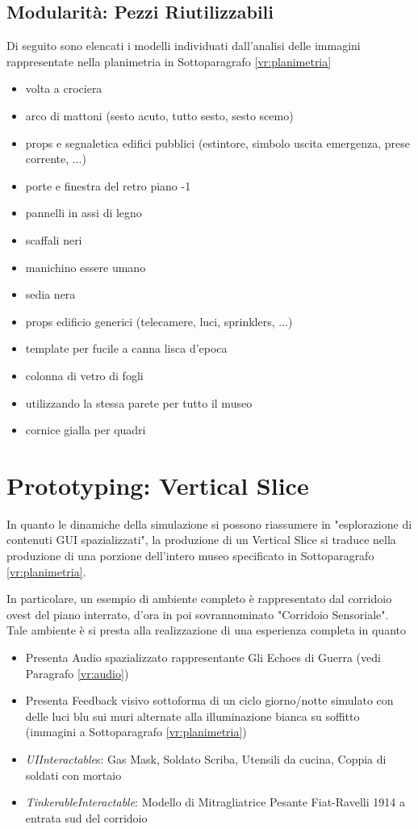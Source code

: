 \documentclass[10pt, openany]{article}
\begin{document}
  \subsection{Modularit\`a: Pezzi Riutilizzabili}\label{vr:modules}
  Di seguito sono elencati i modelli individuati dall'analisi delle immagini rappresentate nella planimetria in Sottoparagrafo \ref{vr:planimetria}
  \begin{itemize}[topsep=0pt, noitemsep]
    \item volta a crociera
    \item arco di mattoni (sesto acuto, tutto sesto, sesto scemo)
    \item props e segnaletica edifici pubblici (estintore, simbolo uscita emergenza, prese corrente, ...)
    \item porte e finestra del retro piano -1
    \item pannelli in assi di legno
    \item scaffali neri
    \item manichino essere umano
    \item sedia nera
    \item props edificio generici (telecamere, luci, sprinklers, ...)
    \item template per fucile a canna lisca d'epoca
    \item colonna di vetro di fogli
    \item utilizzando la stessa parete per tutto il museo
    \item cornice gialla per quadri
  \end{itemize}
  \section{Prototyping: Vertical Slice}
  In quanto le dinamiche della simulazione si possono riassumere in "esplorazione di contenuti GUI spazializzati", la produzione di un Vertical Slice si traduce nella produzione di 
  una porzione dell'intero museo specificato in Sottoparagrafo \ref{vr:planimetria}.\par
  In particolare, un esempio di ambiente completo \`e rappresentato dal corridoio ovest del piano interrato, d'ora in poi sovrannominato "Corridoio Sensoriale". Tale ambiente \`e 
  si presta alla realizzazione di una esperienza completa in quanto
  \begin{itemize}[topsep=0pt, noitemsep]
    \item Presenta Audio spazializzato rappresentante Gli Echoes di Guerra (vedi Paragrafo \ref{vr:audio})
    \item Presenta Feedback visivo sottoforma di un ciclo giorno/notte simulato con delle luci blu sui muri alternate alla illuminazione bianca su soffitto (immagini a 
      Sottoparagrafo \ref{vr:planimetria})
    \item \textit{UIInteractable}s: Gas Mask, Soldato Scriba, Utensili da cucina, Coppia di soldati con mortaio
    \item \textit{TinkerableInteractable}: Modello di Mitragliatrice Pesante Fiat-Ravelli 1914 a entrata sud del corridoio
  \end{itemize}
\end{document}

